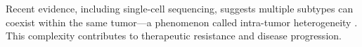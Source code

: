Recent evidence, including single-cell sequencing, suggests multiple subtypes can coexist within the same tumor—a phenomenon called intra-tumor heterogeneity \textcite{intratumor_heterogeneity_Yeo2017,origins_and_evolution_bca_Polyak2007}. This complexity contributes to therapeutic resistance and disease progression.



